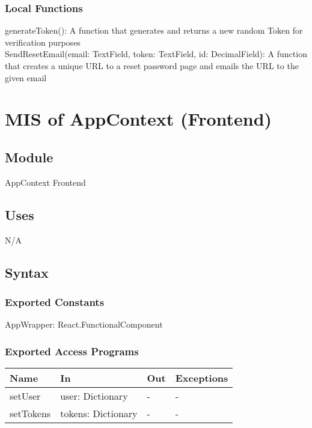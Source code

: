 \documentclass[12pt, titlepage]{article}
\begin{document}
\subsubsection{Local Functions}

generateToken(): A function that generates and returns a new random Token for verification purposes \\
SendResetEmail(email: TextField, token: TextField, id: DecimalField): A function that creates a unique URL to a reset password page and emails the URL to the given email

\newpage

\section{MIS of AppContext (Frontend)} \label{appContext}

\subsection{Module}

AppContext Frontend

\subsection{Uses}
N/A

\subsection{Syntax}

\subsubsection{Exported Constants}
AppWrapper: React.FunctionalComponent

\subsubsection{Exported Access Programs}

\begin{center}
    \begin{tabular}{p{3cm} p{4cm} p{4cm} p{2cm}}
    \hline
    \textbf{Name} & \textbf{In} & \textbf{Out} & \textbf{Exceptions} \\
    \hline
    setUser & user: Dictionary & - & - \\
    setTokens & tokens: Dictionary & - & - \\
    \hline
    \end{tabular}
\end{center}
\end{document}
